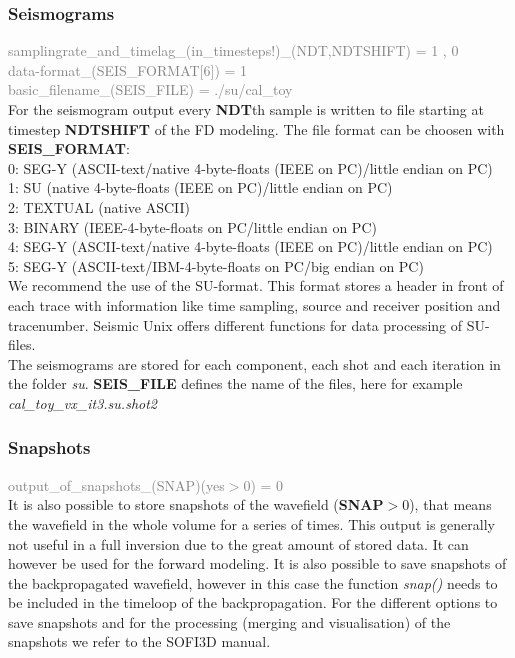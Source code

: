 \subsubsection*{Seismograms}
\textcolor {Gray}{samplingrate\_and\_timelag\_(in\_timesteps!)\_(NDT,NDTSHIFT) = 1 , 0\\
data-format\_(SEIS\_FORMAT[6]) = 1\\
basic\_filename\_(SEIS\_FILE) = ./su/cal\_toy}\vspace{0.1cm}\\
For the seismogram output every \textbf{NDT}th sample is written to file starting at timestep \textbf{NDTSHIFT} of the FD modeling. The file format can be choosen with \textbf{SEIS\_FORMAT}:\\
0: SEG-Y (ASCII-text/native 4-byte-floats (IEEE on PC)/little endian on PC)\\
1: SU (native 4-byte-floats (IEEE on PC)/little endian on PC)\\
2: TEXTUAL (native ASCII)\\
3: BINARY (IEEE-4-byte-floats on PC/little endian on PC)\\
4: SEG-Y (ASCII-text/native 4-byte-floats (IEEE on PC)/little endian on PC)\\
5: SEG-Y (ASCII-text/IBM-4-byte-floats on PC/big endian on PC) \\
We recommend the use of the SU-format. This format stores a header in front of each trace with information like time sampling, source and receiver position and tracenumber. Seismic Unix offers different functions for data processing of SU-files.\\
The seismograms are stored for each component, each shot and each iteration in the folder \textit{su}. \textbf{SEIS\_FILE} defines the name of the files, here for example \textit{cal\_toy\_vx\_it3.su.shot2}
\subsubsection*{Snapshots}
\textcolor {Gray}{output\_of\_snapshots\_(SNAP)(yes$>$0) = 0}\vspace{0.1cm}\\
It is also possible to store snapshots of the wavefield (\textbf{SNAP}$>$0), that means the wavefield in the whole volume for a series of times. This output is generally not useful in a full inversion due to the great amount of stored data. It can however be used for the forward modeling. It is also possible to save snapshots of the backpropagated wavefield, however in this case the function \textit{snap()} needs to be included in the timeloop of the backpropagation. For the different options to save snapshots and for the processing (merging and visualisation) of the snapshots we refer to the SOFI3D manual.
